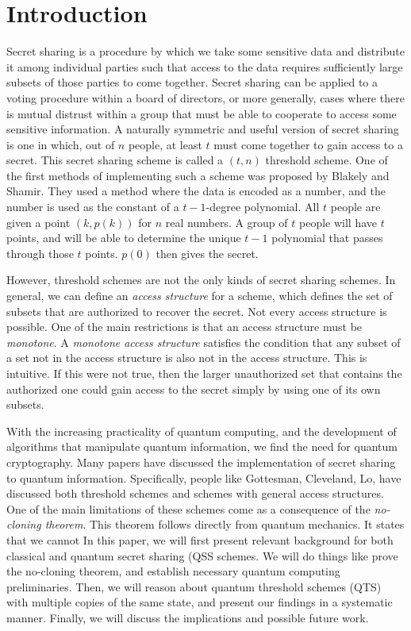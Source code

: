 \chapter{Introduction}

Secret sharing is a procedure by which we take some sensitive data and distribute it among individual parties such that access to the data requires sufficiently large subsets of those parties to come together. Secret sharing can be applied to a voting procedure within a board of directors, or more generally, cases where there is mutual distrust within a group that must be able to cooperate to access some sensitive information. A naturally symmetric and useful version of secret sharing is one in which, out of $n$ people, at least $t$ must come together to gain access to a secret. This secret sharing scheme is called a $(t,n)$ threshold scheme. One of the first methods of implementing such a scheme was proposed by Blakely and Shamir. They used a method where the data is encoded as a number, and the number is used as the constant of a $t-1$-degree polynomial. All $t$ people are given a point $(k, p(k))$ for $n$ real numbers. A group of $t$ people will have $t$ points, and will be able to determine the unique $t-1$ polynomial that passes through those $t$ points. $p(0)$ then gives the secret.

However, threshold schemes are not the only kinds of secret sharing schemes. In general, we can define an \textit{access structure} for a scheme, which defines the set of subsets that are authorized to recover the secret. Not every access structure is possible. One of the main restrictions is that an access structure must be \textit{monotone}. A \textit{monotone access structure} satisfies the condition that any subset of a set not in the access structure is also not in the access structure. This is intuitive. If this were not true, then the larger unauthorized set that contains the authorized one could gain access to the secret simply by using one of its own subsets. 

With the increasing practicality of quantum computing, and the development of algorithms that manipulate quantum information, we find the need for quantum cryptography. Many papers have discussed the implementation of secret sharing to quantum information. Specifically, people like Gottesman, Cleveland, Lo, have discussed both threshold schemes and schemes with general access structures. One of the main limitations of these schemes come as a consequence of the \textit{no-cloning theorem}. This theorem follows directly from quantum mechanics. It states that we cannot In this paper, we will first present relevant background for both classical and quantum secret sharing (QSS schemes. We will do things like prove the no-cloning theorem, and establish necessary quantum computing preliminaries. Then, we will reason about quantum threshold schemes (QTS) with multiple copies of the same state, and present our findings in a systematic manner. Finally, we will discuss the implications and possible future work.